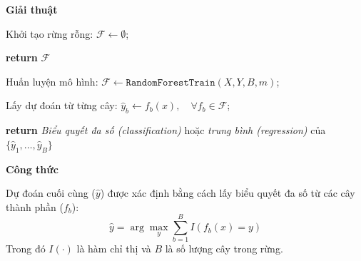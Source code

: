 \textbf{\large G}\textbf{iải thuật}

\setcounter{algocf}{1} %

\begin{algorithm}[H]
\DontPrintSemicolon
\caption{\texttt{RandomForestTrain} - Huấn luyện mô hình Random Forest}


Khởi tạo rừng rỗng: $\mathcal{F} \leftarrow \emptyset$;\;

\textbf{return} $\mathcal{F}$\;
\end{algorithm}
\begin{algorithm}[H]
\DontPrintSemicolon
\caption{\texttt{RandomForestPredict} - Dự đoán với mô hình Random Forest}


Huấn luyện mô hình: $\mathcal{F} \leftarrow \texttt{RandomForestTrain}(X, Y, B, m)$;\;

Lấy dự đoán từ từng cây: $\hat{y}_b \leftarrow f_b(x), \quad \forall f_b \in \mathcal{F}$;\;

\textbf{return} \textit{Biểu quyết đa số (classification)} hoặc \textit{trung bình (regression)} của $\{\hat{y}_1, \dots, \hat{y}_B\}$\;
\end{algorithm}




\textbf{\large C}\textbf{ông thức} 

Dự đoán cuối cùng ($\hat{y}$) được xác định bằng cách lấy biểu quyết đa số từ các cây thành phần ($f_b$):
\begin{equation}
\hat{y} = \arg\max_y \sum_{b=1}^{B} I(f_b(x) = y)
\end{equation}
Trong đó $I(\cdot)$ là hàm chỉ thị và $B$ là số lượng cây trong rừng.

